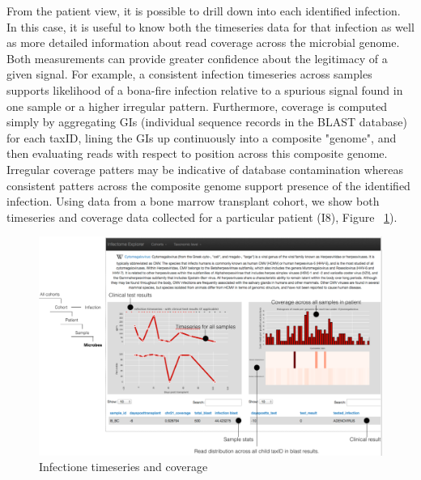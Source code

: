 From the patient view, it is possible to drill down into each identified infection. In this case, it is useful to know both the timeseries data for that infection as well as more detailed information about read coverage across the microbial genome. Both measurements can provide greater confidence about the legitimacy of a given signal. For example, a consistent infection timeseries across samples supports likelihood of a bona-fire infection relative to a spurious signal found in one sample or a higher irregular pattern. Furthermore, coverage is computed simply by aggregating GIs (individual sequence records in the BLAST database) for each taxID, lining the GIs up continuously into a composite "genome", and then evaluating reads with respect to position across this composite genome. Irregular coverage patters may be indicative of 
database contamination whereas consistent patters across the composite genome support presence of the identified infection. Using data from a bone marrow transplant cohort, we show both timeseries and coverage data collected for a particular patient (I8), Figure ~\ref{fig:Fig7}).

\begin{figure}
\center\includegraphics[width=150mm,scale=0.5]{Figures/Fig7}
\caption{Infectione timeseries and coverage}
\label{fig:Fig7}
\end{figure}

